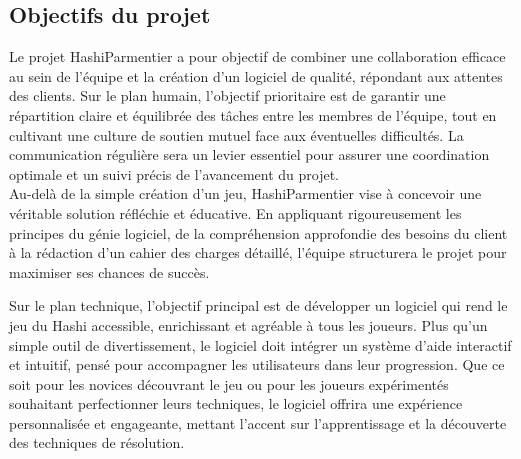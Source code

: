\subsection{Objectifs du projet}
Le projet HashiParmentier a pour objectif de combiner une collaboration efficace au sein de l’équipe et la création d’un logiciel de qualité, répondant aux attentes des clients. Sur le plan humain, l’objectif prioritaire est de garantir une répartition claire et équilibrée des tâches entre les membres de l’équipe, tout en cultivant une culture de soutien mutuel face aux éventuelles difficultés. La communication régulière sera un levier essentiel pour assurer une coordination optimale et un suivi précis de l’avancement du projet. \\

Au-delà de la simple création d’un jeu, HashiParmentier vise à concevoir une véritable solution réfléchie et éducative. En appliquant rigoureusement les principes du génie logiciel, de la compréhension approfondie des besoins du client à la rédaction d’un cahier des charges détaillé, l’équipe structurera le projet pour maximiser ses chances de succès. 

Sur le plan technique, l’objectif principal est de développer un logiciel qui rend le jeu du Hashi accessible, enrichissant et agréable à tous les joueurs. Plus qu’un simple outil de divertissement, le logiciel doit intégrer un système d’aide interactif et intuitif, pensé pour accompagner les utilisateurs dans leur progression. Que ce soit pour les novices découvrant le jeu ou pour les joueurs expérimentés souhaitant perfectionner leurs techniques, le logiciel offrira une expérience personnalisée et engageante, mettant l’accent sur l’apprentissage et la découverte des techniques de résolution. 

